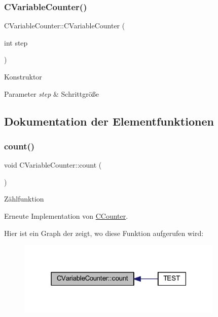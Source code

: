 \subsubsection{\texorpdfstring{C\+Variable\+Counter()}{CVariableCounter()}\hspace{0.1cm}{\footnotesize\ttfamily [2/2]}}
{\footnotesize\ttfamily C\+Variable\+Counter\+::\+C\+Variable\+Counter (\begin{DoxyParamCaption}\item[{int}]{step }\end{DoxyParamCaption})}

Konstruktor 
\begin{DoxyParams}{Parameter}
{\em step} & Schrittgröße \\
\hline
\end{DoxyParams}


\subsection{Dokumentation der Elementfunktionen}
\mbox{\label{class_c_variable_counter_a693c27202acd18d53c4642ce642927bc}} 
\subsubsection{\texorpdfstring{count()}{count()}}
{\footnotesize\ttfamily void C\+Variable\+Counter\+::count (\begin{DoxyParamCaption}{ }\end{DoxyParamCaption})\hspace{0.3cm}{\ttfamily [virtual]}}

Zählfunktion 

Erneute Implementation von \hyperlink{class_c_counter_a90f3e164f3fc1dcf91044702d6940c4d}{C\+Counter}.

Hier ist ein Graph der zeigt, wo diese Funktion aufgerufen wird\+:\nopagebreak
\begin{figure}[H]
\begin{center}
\leavevmode
\includegraphics[width=279pt]{class_c_variable_counter_a693c27202acd18d53c4642ce642927bc_icgraph}
\end{center}
\end{figure}


